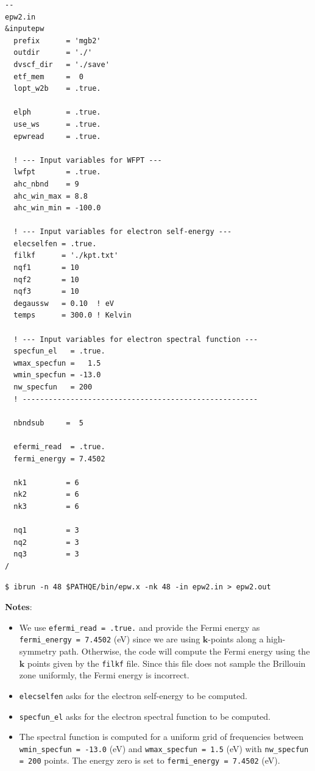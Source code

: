 \documentclass[a4paper,11pt,serif]{article}
\newcommand{\mb}[1]{\mathbf{#1}}
\begin{document}
\begin{scriptsize}
 \begin{Verbatim}[frame=single]
--                                                                                                 epw2.in
&inputepw
  prefix      = 'mgb2'
  outdir      = './'
  dvscf_dir   = './save'
  etf_mem     =  0
  lopt_w2b    = .true.

  elph        = .true.
  use_ws      = .true.
  epwread     = .true.

  ! --- Input variables for WFPT ---
  lwfpt       = .true.
  ahc_nbnd    = 9
  ahc_win_max = 8.8
  ahc_win_min = -100.0

  ! --- Input variables for electron self-energy ---
  elecselfen = .true.
  filkf      = './kpt.txt'
  nqf1       = 10
  nqf2       = 10
  nqf3       = 10
  degaussw   = 0.10  ! eV
  temps      = 300.0 ! Kelvin

  ! --- Input variables for electron spectral function ---
  specfun_el   = .true.
  wmax_specfun =   1.5
  wmin_specfun = -13.0
  nw_specfun   = 200
  ! ------------------------------------------------------

  nbndsub     =  5

  efermi_read  = .true.
  fermi_energy = 7.4502

  nk1         = 6
  nk2         = 6
  nk3         = 6

  nq1         = 3
  nq2         = 3
  nq3         = 3
/
\end{Verbatim}
\end{scriptsize}

\begin{verbatim}
$ ibrun -n 48 $PATHQE/bin/epw.x -nk 48 -in epw2.in > epw2.out
\end{verbatim}

\begin{footnotesize}
   {\bf Notes}:
   \begin{itemize}
      \item We use \texttt{efermi\_read = .true.} and provide the Fermi energy as \texttt{fermi\_energy = 7.4502} (eV) since we are using $\mb{k}$-points along a high-symmetry path. Otherwise, the code will compute the Fermi energy using the $\mb{k}$ points given by the \texttt{filkf} file. Since this file does not sample the Brillouin zone uniformly, the Fermi energy is incorrect.
      \item \texttt{elecselfen} asks for the electron self-energy to be computed.
      \item \texttt{specfun\_el} asks for the electron spectral function to be computed.
      \item The spectral function is computed for a uniform grid of frequencies between \texttt{wmin\_specfun = -13.0} (eV) and \texttt{wmax\_specfun = 1.5} (eV) with \texttt{nw\_specfun = 200} points. The energy zero is set to \texttt{fermi\_energy = 7.4502} (eV).
   \end{itemize}
\end{footnotesize}
\end{document}

